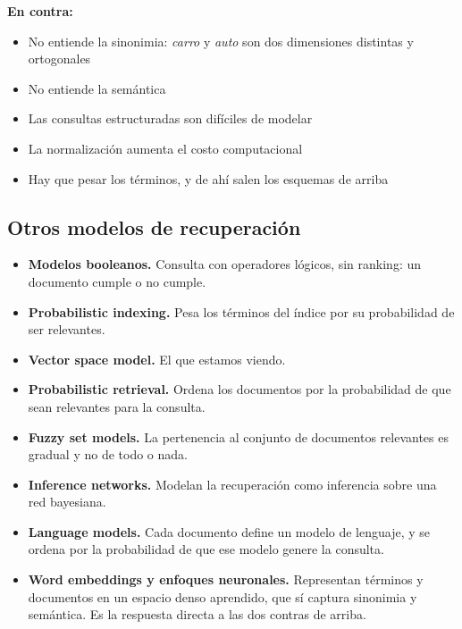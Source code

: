\documentclass[11pt,letterpaper]{article}
\begin{document}
\textbf{En contra:}
\begin{itemize}[itemsep=0.1em]
    \item No entiende la sinonimia: \textit{carro} y \textit{auto}
          son dos dimensiones distintas y ortogonales
    \item No entiende la semántica
    \item Las consultas estructuradas son difíciles de modelar
    \item La normalización aumenta el costo computacional
    \item Hay que pesar los términos, y de ahí salen los esquemas de
          arriba
\end{itemize}


\subsection*{Otros modelos de recuperación}

\begin{itemize}[itemsep=0.2em]
    \item \textbf{Modelos booleanos.} Consulta con operadores
          lógicos, sin ranking: un documento cumple o no cumple.
    \item \textbf{Probabilistic indexing.} Pesa los términos del
          índice por su probabilidad de ser relevantes.
    \item \textbf{Vector space model.} El que estamos viendo.
    \item \textbf{Probabilistic retrieval.} Ordena los documentos por
          la probabilidad de que sean relevantes para la consulta.
    \item \textbf{Fuzzy set models.} La pertenencia al conjunto de
          documentos relevantes es gradual y no de todo o nada.
    \item \textbf{Inference networks.} Modelan la recuperación como
          inferencia sobre una red bayesiana.
    \item \textbf{Language models.} Cada documento define un modelo
          de lenguaje, y se ordena por la probabilidad de que ese
          modelo genere la consulta.
    \item \textbf{Word embeddings y enfoques neuronales.} Representan
          términos y documentos en un espacio denso aprendido, que sí
          captura sinonimia y semántica. Es la respuesta directa a
          las dos contras de arriba.
\end{itemize}
\end{document}
